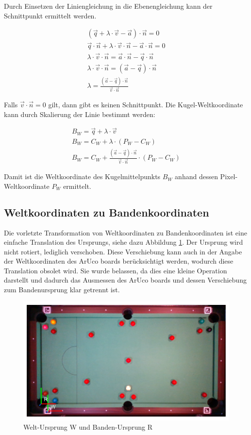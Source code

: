 Durch Einsetzen der Liniengleichung in die Ebenengleichung kann der Schnittpunkt ermittelt werden.

\begin{align}
(\vec{q} + \lambda \cdot \vec{v} - \vec{a}) \cdot \vec{n} = 0\\
\vec{q} \cdot \vec{n} + \lambda \cdot \vec{v} \cdot \vec{n} - \vec{a} \cdot \vec{n} = 0\\
\lambda \cdot \vec{v} \cdot \vec{n} = \vec{a} \cdot \vec{n} - \vec{q} \cdot \vec{n}\\
\lambda \cdot \vec{v} \cdot \vec{n} = (\vec{a} - \vec{q}) \cdot \vec{n}\\
\lambda = \frac{(\vec{a} - \vec{q}) \cdot \vec{n}}{\vec{v} \cdot \vec{n}}
\end{align}

Falls $\vec{v} \cdot \vec{n} = 0$ gilt, dann gibt es keinen Schnittpunkt.
Die Kugel-Weltkoordinate kann durch Skalierung der Linie bestimmt werden:

\begin{align}
B_W = \vec{q} + \lambda \cdot \vec{v}\\
B_W = C_W + \lambda \cdot (P_W - C_W)\\
B_W = C_W + \frac{(\vec{a} - \vec{q}) \cdot \vec{n}}{\vec{v} \cdot \vec{n}} \cdot (P_W - C_W)
\end{align}

Damit ist die Weltkoordinate des Kugelmittelpunkts $B_W$ anhand dessen Pixel-Weltkoordinate $P_W$ ermittelt.


\subsection{Weltkoordinaten zu Bandenkoordinaten}\label{kap:world_to_rail}

Die vorletzte Transformation von Weltkoordinaten zu Bandenkoordinaten ist eine einfache Translation des Ursprungs,
siehe dazu Abbildung \ref{fig:table_world_to_rail}. Der Ursprung wird nicht rotiert, lediglich verschoben.
Diese Verschiebung kann auch in der Angabe der Weltkoordinaten des ArUco boards berücksichtigt werden, wodurch diese
Translation obsolet wird. Sie wurde belassen, da dies eine kleine Operation darstellt und dadurch das Ausmessen des
ArUco boards und dessen Verschiebung zum Bandenursprung klar getrennt ist.

\begin{figure}[h!]
    \begin{center}
    \includegraphics[width=0.6\linewidth]{../common/resources/coordinate_systems/table_world_to_rail.png}
    \end{center}
    \caption{Welt-Ursprung W und Banden-Ursprung R}
    \label{fig:table_world_to_rail}
\end{figure}


